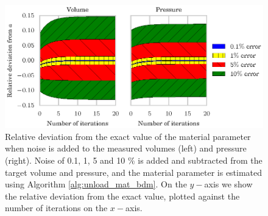 \begin{figure}[htbp]
  \centering
    \includegraphics{figures/materror_noise}
   \caption{\label{fig:unloaded_materror_noise}  Relative deviation from the
     exact value of the material parameter when noise is added
     to the measured volumes (left)
     and pressure (right). Noise of 0.1, 1, 5 and 10 $\%$
     is added and subtracted from the target volume and pressure, and
     the material parameter is estimated using Algorithm
     \ref{alg:unload_mat_bdm}. On the $y-$axis we show the
     relative deviation from the exact value, plotted against the number
   of iterations on the $x-$axis. }
\end{figure} 


\newpage


% 





